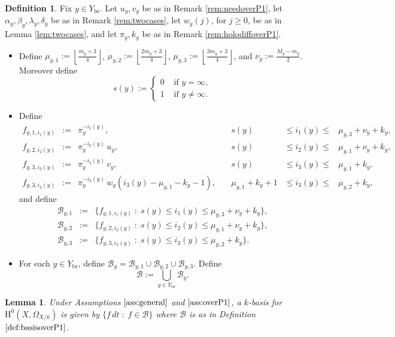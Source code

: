 \documentclass{amsart}
\numberwithin{equation}{section}
\numberwithin{table}{section}
\theoremstyle{plain}
\newtheorem{lemma}[theorem]{Lemma}
\theoremstyle{definition}
\newtheorem{definition}[theorem]{Definition}
\theoremstyle{remark}
\newcommand{\HH}{\mathrm{H}}
\begin{document}
\begin{definition}
\label{def:basisoverP1}
Fix $y\in Y_{\mathrm{br}}$. Let $u_y,v_y$ be as in Remark \ref{rem:needoverP1}, let $\alpha_y,\beta_y,\lambda_y, \delta_y$ be as in Remark \ref{rem:twocases}, let $w_y(j)$, for $j\ge 0$, be as in Lemma \ref{lem:twocases}, and let $\pi_y,k_y$ be as in Remark \ref{rem:holodiffoverP1}.
\begin{itemize}
\item[(a)]
Define $\mu_{y,1}:=\left\lfloor \frac{m_y+3}{4} \right\rfloor$, $\mu_{y,2}:=\left\lfloor \frac{2m_y+3}{4} \right\rfloor$, $\mu_{y,3}:=\left\lfloor \frac{3m_y+3}{4} \right\rfloor$, and $\nu_y:=\frac{M_y-m_y}{2}$. Moreover define
$$s(y):=\left\{ \begin{array}{cl} 0&\mbox{ if $y=\infty$},\\
1&\mbox{ if $y\ne \infty$}.
\end{array}\right.$$
\item[(b)] Define 
$$\begin{array}{rclccl}
f_{y,1,i_1(y)} &:=& \pi_y^{-i_1(y)}, & s(y)&\le i_1(y) \le& \mu_{y,3}  + \nu_y + k_y ,\\[1ex]
f_{y,2,i_2(y)} &:=& \pi_y^{-i_2(y)}\, u_y, & s(y)&\le i_2(y) \le& \mu_{y,1} + \nu_y + k_y ,\\[1ex]
f_{y,3,i_3(y)} &:=& \pi_y^{-i_3(y)}\, v_y, & s(y)&\le i_3(y) \le& \mu_{y,1} + k_y  ,\\[1ex]
f_{y,3,i_3(y)} &:=& \pi_y^{-i_3(y)}\, w_{y}\left(i_3(y) - \mu_{y,1} - k_y - 1\right), \quad& \mu_{y,1} + k_y +1  &\le i_3(y) \le& \mu_{y,2}  + k_y ,
\end{array}$$
and define 
\begin{eqnarray*}
\mathcal{B}_{y,1} &:=& \{f_{y,1,i_1(y)}\; : \; s(y)\le i_1(y) \le \mu_{y,3}  + \nu_y + k_y \} ,\\
\mathcal{B}_{y,2} &:=& \{f_{y,2,i_2(y)}\; : \; s(y)\le i_2(y) \le \mu_{y,1} + \nu_y + k_y \},\\
\mathcal{B}_{y,3} &:=& \{f_{y,3,i_3(y)}\; : \; s(y)\le i_3(y) \le \mu_{y,2}  + k_y \}.
\end{eqnarray*}
\item[(c)]
For each $y\in Y_{\mathrm{br}}$, define $\mathcal{B}_y=\mathcal{B}_{y,1} \cup \mathcal{B}_{y,2} \cup \mathcal{B}_{y,3}$. Define
$$\mathcal{B} := \bigcup_{y\in Y_{\mathrm{br}}} \mathcal{B}_y.$$
\end{itemize}
\end{definition}

\begin{lemma}
\label{lem:basisoverP1}
Under Assumptions $\ref{ass:general}$ and $\ref{ass:overP1}$, a $k$-basis for $\HH^0(X,\Omega_{X/k})$ is given by $\{f\,dt\; :\; f\in\mathcal{B}\}$ where $\mathcal{B}$ is as in Definition $\ref{def:basisoverP1}$.
\end{lemma}
\end{document}
